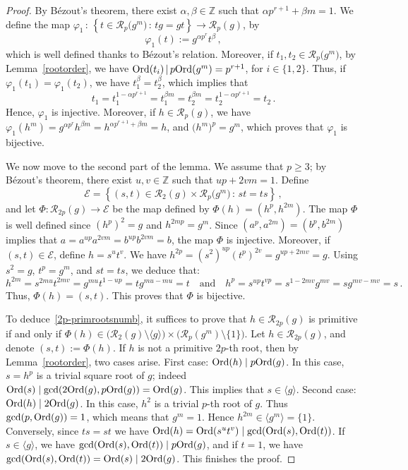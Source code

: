 \documentclass[12pt]{amsart}
\numberwithin{equation}{section}
\newcommand{\Ord}{{\rm Ord}}
\newcommand{\Z}{\mathbb Z}
\theoremstyle{definition}
\theoremstyle{remark}
\begin{document}
\begin{proof}
    By Bézout's theorem, there exist $\alpha,\beta \in \Z$ such that $\alpha p^{r+1}+\beta m=1$. We define the map $\varphi_1\, \colon\, \left\{ t\in \mathcal{R}_p\bigl(g^m\bigr)\, \colon\,  tg=gt\right\}\to \mathcal{R}_p(g)$, by \[\varphi_1(t):=g^{\alpha p^{r}}t^\beta\, ,\]
    which is well defined thanks to Bézout's relation. Moreover, if $t_1,t_2\in \mathcal{R}_p\bigl(g^m\bigr)$, by Lemma~\ref{rootorder}, we have $\Ord(t_i)\, | \, p\Ord(g^m)=p^{r+1}$, for $i\in \{1,2\}$. Thus, if $\varphi_1(t_1)=\varphi_1(t_2)$, we have $t_1^\beta=t_2^\beta$, which implies that \[t_1=t_1^{1-\alpha p^{r+1}}=t_1^{\beta m}=t_2^{\beta m}=t_2^{1-\alpha p^{r+1}}=t_2\, .\]
    Hence, $\varphi_1$ is injective. Moreover, if $h\in \mathcal{R}_p(g)$, we have $\varphi_1(h^m)=g^{\alpha p^r}h^{\beta m}=h^{\alpha p^{r+1} +\beta m}=h$, and $\bigl(h^m\bigr)^p=g^m$, which proves that $\varphi_1$ is bijective.
    
    We now move to the second part of the lemma. We assume that $p\ge 3$; by Bézout's theorem, there exist $u,v\in \Z$ such that $up+2vm=1$. Define \[\mathcal{E}=\left\{(s,t)\in \mathcal{R}_2(g) \times\mathcal{R}_p\bigl(g^m\bigr)\, \colon\,  st=ts\right\}\, ,\]
    and let $\Phi:\mathcal{R}_{2p}(g)\to \mathcal{E}$ be the map defined by $\Phi(h)=\left(h^p,h^{2m}\right)$. The map $\Phi$ is well defined since $(h^{p})^2=g$ and $h^{2mp}=g^m$. Since $\left(a^{p},a^{2m}\right)=\left(b^{p},b^{2m}\right)$ implies that $a=a^{up} a^{2vm}=b^{up}b^{2vm}=b$, the map $\Phi$ is injective. Moreover, if $(s,t)\in \mathcal{E}$, define $h=s^ut^v$. We have $h^{2p}=(s^2)^{up} (t^p)^{2v}=g^{up+2mv}=g$. Using $s^2=g$, $t^p=g^m$, and $st=ts$, we deduce that:
    \[h^{2m}=s^{2mu}t^{2mv}=g^{mu}t^{1-up}=t g^{mu-mu}=t\quad\text{and}\quad h^{p}=s^{up}t^{vp}=s^{1-2mv}g^{mv}=s g^{mv-mv}=s\, .\]
    Thus, $\Phi(h)=(s,t)$. This proves that $\Phi$ is bijective.
    
    To deduce~\eqref{2p-primrootsnumb}, it suffices to prove that $h\in \mathcal{R}_{2p}(g)$ is primitive if and only if $\Phi(h)\in \bigl(\mathcal{R}_2(g)\setminus \langle g\rangle\bigr) \times  \bigl(\mathcal{R}_p(g^m)\setminus\{1\}\bigr)$. Let $h\in \mathcal{R}_{2p}(g)$, and denote $(s,t):=\Phi(h)$. If $h$ is not a primitive $2p$-th root, then by Lemma~\ref{rootorder}, two cases arise. First case: $\Ord(h) \mid p\Ord(g)$. In this case, $s=h^p$ is a trivial square root of $g$; indeed $\Ord(s)\mid \gcd(2\Ord(g),p\Ord(g))=\Ord(g)$. This implies that $s\in \langle g\rangle$. Second case: $\Ord(h)\mid 2\Ord(g)$. In this case, $h^2$ is a trivial $p$-th root of $g$. Thus $\gcd(p,\Ord(g))=1$, which means that $g^m=1$. Hence $h^{2m}\in \langle g^m\rangle =\{1\}$. Conversely, since $ts=st$ we have $\Ord(h)=\Ord(s^u t^v)\mid \gcd (\Ord(s),\Ord(t))$. If $s\in \langle g\rangle$, we have $\gcd(\Ord(s),\Ord(t))\mid p\Ord(g)$, and if $t=1$, we have $\gcd(\Ord(s),\Ord(t))=\Ord(s)\mid 2\Ord(g)$. This finishes the proof.
\end{proof}
\end{document}
